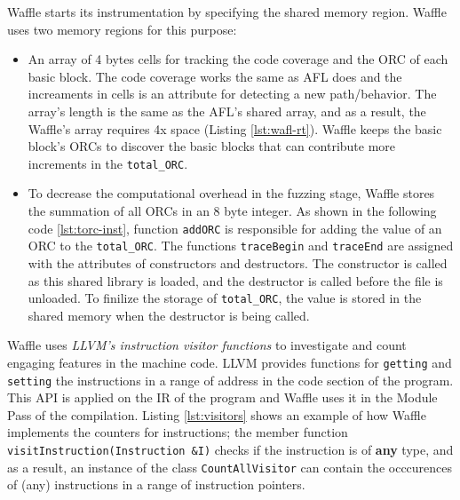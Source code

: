 
Waffle starts its instrumentation by specifying the shared memory region. Waffle uses two memory regions for this purpose:

\begin{itemize}
  \item An array of 4 bytes cells for tracking the code coverage and the ORC of each basic block. The code coverage works the same as AFL does and the increaments in cells is an attribute for detecting a new path/behavior. The array's length is the same as the AFL's shared array, and as a result, the Waffle's array requires 4x space (Listing \ref{lst:wafl-rt}). Waffle keeps the basic block's ORCs to discover the basic blocks that can contribute more increments in the \texttt{total\_ORC}.
  
  

  \item To decrease the computational overhead in the fuzzing stage, Waffle stores the summation of all ORCs in an 8 byte integer. As shown in the following code \ref{lst:torc-inst}, function \texttt{addORC} is responsible for adding the value of an ORC to the \texttt{total\_ORC}. The functions \texttt{traceBegin} and \texttt{traceEnd} are assigned with the attributes of constructors and destructors. The constructor is called as this shared library is loaded, and the destructor is called before the file is unloaded. To finilize the storage of \texttt{total\_ORC}, the value is stored in the shared memory when the destructor is being called. 
  
  
\end{itemize}


Waffle uses \textit{LLVM's instruction visitor functions} \cite{inst_visitor} to investigate and count engaging features in the machine code. LLVM provides functions for \texttt{getting} and \texttt{setting} the instructions in a range of address in the code section of the program. This API is applied on the IR of the program and Waffle uses it in the Module Pass of the compilation. Listing \ref{lst:visitors} shows an example of how Waffle implements the counters for instructions; the member function \texttt{visitInstruction(Instruction \&I)} checks if the instruction is of \textbf{any} type, and as a result, an instance of the class \texttt{CountAllVisitor} can contain the occcurences of (any) instructions in a range of instruction pointers.

